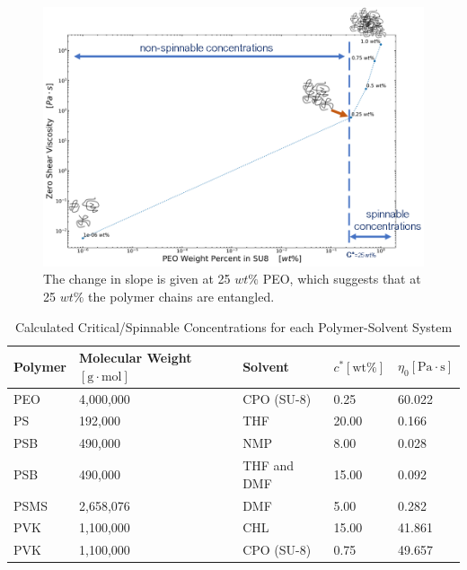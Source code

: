 \begin{figure}[!th]
\centering
\includegraphics[width=\textwidth]{./Figures/criticalConcentrationCalculation.png}
\decoRule
\caption[Estimation of the Critical Concentration of the PEO in SU-8 solutions]{The change in slope is given at 25 $wt\%$ PEO, which suggests that at 25 $wt\%$ the polymer chains are entangled.}
\label{fig:criticalConcentrationCalculation}
\end{figure}

\begin{table}[!th]
\centering
\caption[Calculated Critical/Spinnable Concentrations for each Polymer-Solvent System]{Calculated Critical/Spinnable Concentrations for each Polymer-Solvent System}
\begin{tabular}{lllll}
\hline
\textbf{Polymer} & \textbf{Molecular Weight $[\textrm{g} \cdot \textrm{mol}]$} & \textbf{Solvent} & \textbf{$c^* [\textrm{wt}\%]$} & \textbf{$\eta_0 [\textrm{Pa} \cdot \textrm{s}]$} \\
\hline
PEO  & 4,000,000                  & CPO (SU-8)  & 0.25  & 60.022 \\
PS   & 192,000                    & THF         & 20.00 & 0.166  \\
PSB  & 490,000   \cite{Doan2013}  & NMP         & 8.00  & 0.028  \\
PSB  & 490,000   \cite{Doan2013}  & THF and DMF & 15.00 & 0.092  \\
PSMS & 2,658,076 \cite{Colby1987} & DMF         & 5.00  & 0.282  \\
PVK  & 1,100,000                  & CHL         & 15.00 & 41.861 \\
PVK  & 1,100,000                  & CPO (SU-8)  & 0.75  & 49.657 \\
\hline
\end{tabular}
\label{tab:calculatedSpinnableConcentrations}
\end{table}

